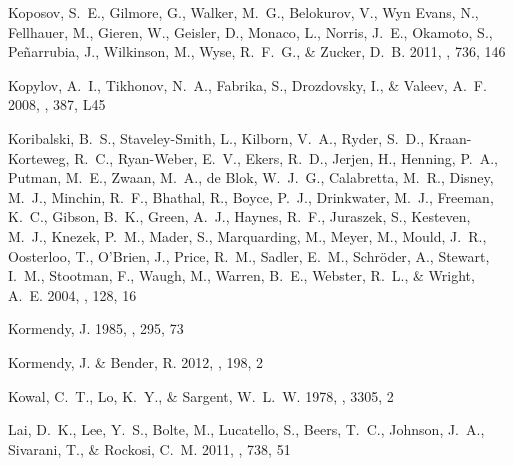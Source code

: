 \documentclass[manuscript]{aastex}
\begin{document}
\begin{thebibliography}{381}
{Koposov}, S.~E., {Gilmore}, G., {Walker}, M.~G., {Belokurov}, V., {Wyn Evans},
  N., {Fellhauer}, M., {Gieren}, W., {Geisler}, D., {Monaco}, L., {Norris},
  J.~E., {Okamoto}, S., {Pe{\~n}arrubia}, J., {Wilkinson}, M., {Wyse},
  R.~F.~G., \& {Zucker}, D.~B. 2011, \apj, 736, 146

{Kopylov}, A.~I., {Tikhonov}, N.~A., {Fabrika}, S., {Drozdovsky}, I., \&
  {Valeev}, A.~F. 2008, \mnras, 387, L45

{Koribalski}, B.~S., {Staveley-Smith}, L., {Kilborn}, V.~A., {Ryder}, S.~D.,
  {Kraan-Korteweg}, R.~C., {Ryan-Weber}, E.~V., {Ekers}, R.~D., {Jerjen}, H.,
  {Henning}, P.~A., {Putman}, M.~E., {Zwaan}, M.~A., {de Blok}, W.~J.~G.,
  {Calabretta}, M.~R., {Disney}, M.~J., {Minchin}, R.~F., {Bhathal}, R.,
  {Boyce}, P.~J., {Drinkwater}, M.~J., {Freeman}, K.~C., {Gibson}, B.~K.,
  {Green}, A.~J., {Haynes}, R.~F., {Juraszek}, S., {Kesteven}, M.~J., {Knezek},
  P.~M., {Mader}, S., {Marquarding}, M., {Meyer}, M., {Mould}, J.~R.,
  {Oosterloo}, T., {O'Brien}, J., {Price}, R.~M., {Sadler}, E.~M.,
  {Schr{\"o}der}, A., {Stewart}, I.~M., {Stootman}, F., {Waugh}, M., {Warren},
  B.~E., {Webster}, R.~L., \& {Wright}, A.~E. 2004, \aj, 128, 16

{Kormendy}, J. 1985, \apj, 295, 73

{Kormendy}, J. \& {Bender}, R. 2012, \apjs, 198, 2

{Kowal}, C.~T., {Lo}, K.~Y., \& {Sargent}, W.~L.~W. 1978, \iaucirc, 3305, 2

{Lai}, D.~K., {Lee}, Y.~S., {Bolte}, M., {Lucatello}, S., {Beers}, T.~C.,
  {Johnson}, J.~A., {Sivarani}, T., \& {Rockosi}, C.~M. 2011, \apj, 738, 51


\end{thebibliography}
\end{document}
